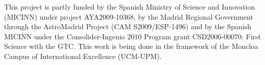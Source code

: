 
\acknowledgements This project is partly funded by the Spanish Ministry of Science and Innovation (MICINN) under project
AYA2009-10368, by the Madrid Regional Government through the AstroMadrid Project (CAM S2009/ESP-1496) and by the Spanish MICINN 
under the Consolider-Ingenio 2010 Program grant CSD2006-00070: First Science with the GTC. 
This work is being done in the framework of the Moncloa Campus of International Excellence (UCM-UPM).
